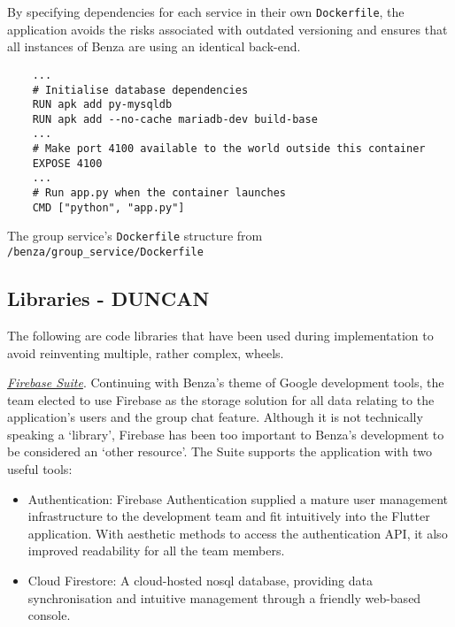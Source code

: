 \documentclass{article}
\begin{document}
    By specifying dependencies for each service in their own \texttt{Dockerfile}, the application avoids the risks associated with outdated versioning and ensures that all instances of Benza are using an identical back-end. \par
    
     \begin{listing}[ht]
    \begin{verbatim}
    ...
    # Initialise database dependencies
    RUN apk add py-mysqldb
    RUN apk add --no-cache mariadb-dev build-base
    ...
    # Make port 4100 available to the world outside this container
    EXPOSE 4100
    ...
    # Run app.py when the container launches
    CMD ["python", "app.py"]
    \end{verbatim}
    \caption{The group service's \texttt{Dockerfile} structure from \texttt{/benza/group_service/Dockerfile}}
    \label{code:groupsdockerfile}
    \end{listing}
    
    \subsection{Libraries - DUNCAN}
    \label{subsec:libraries}
    The following are code libraries that have been used during implementation to avoid reinventing multiple, rather complex, wheels. \par
    
    \emph{\href{https://firebase.google.com/}{Firebase Suite}}. Continuing with Benza's theme of Google development tools, the team elected to use Firebase as the storage solution for all data relating to the application's users and the group chat feature. Although it is not technically speaking a `library', Firebase has been too important to Benza's development to be considered an `other resource'. The Suite supports the application with two useful tools:
    \begin{itemize}
        \item Authentication: Firebase Authentication supplied a mature user management infrastructure to the development team and fit intuitively into the Flutter application. With aesthetic methods to access the authentication API, it also improved readability for all the team members.
        \item Cloud Firestore: A cloud-hosted \acrshort{nosql} database, providing data synchronisation and intuitive management through a friendly web-based console.
    \end{itemize}
    
\end{document}
